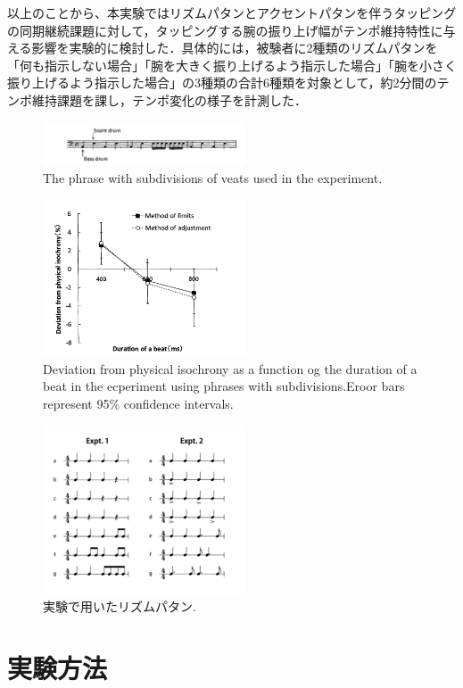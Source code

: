 \documentclass[twocolumn,10pt]{jarticle}
\begin{document}
以上のことから、本実験ではリズムパタンとアクセントパタンを伴うタッピングの同期継続課題に対して，タッピングする腕の振り上げ幅がテンポ維持特性に与える影響を実験的に検討した．具体的には，被験者に2種類のリズムパタンを「何も指示しない場合」「腕を大きく振り上げるよう指示した場合」「腕を小さく振り上げるよう指示した場合」の3種類の合計6種類を対象として，約2分間のテンポ維持課題を課し，テンポ変化の様子を計測した．
\begin{figure}
  \centering
  \includegraphics[width=6cm]{Arao_f1.jpg}
  \caption{The phrase with subdivisions of veats used in the experiment\cite{Arao}.}
  \label{Arao_f1}
\end{figure}
\begin{figure}
  \centering
  \includegraphics[width=6cm]{Arao_f2.jpg}
  \caption{Deviation from physical isochrony as a function og the duration of a beat in the ecperiment using phrases with subdivisions.Eroor bars represent 95\% confidence intervals\cite{Arao}.}
  \label{Arao_f2}
\end{figure}
\begin{figure}
  \centering
  \includegraphics[width=6cm]{Nagasima.jpg}
  \caption{実験で用いたリズムパタン\cite{Nagasima}.}
  \label{Nagasima}
\end{figure}

\section{実験方法}
\end{document}
